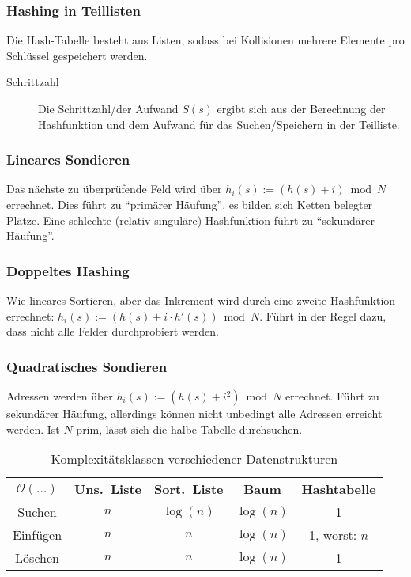 \subsubsection{Hashing in Teillisten}
Die Hash-Tabelle besteht aus Listen, sodass bei Kollisionen mehrere Elemente pro Schlüssel gespeichert werden.
\begin{description}
  \item[Schrittzahl] Die Schrittzahl/der Aufwand $S(s)$ ergibt sich aus der Berechnung der Hashfunktion und dem Aufwand für das Suchen/Speichern in der Teilliste.
\end{description}

\subsubsection{Lineares Sondieren}
Das nächste zu überprüfende Feld wird über $h_i(s) := (h(s) + i) \bmod N$ errechnet.
Dies führt zu \enquote{primärer Häufung}, es bilden sich Ketten belegter Plätze.
Eine schlechte (relativ singuläre) Hashfunktion führt zu \enquote{sekundärer Häufung}.

\subsubsection{Doppeltes Hashing}
Wie lineares Sortieren, aber das Inkrement wird durch eine zweite Hashfunktion errechnet: $h_i(s) := (h(s) + i \cdot h'(s)) \bmod N$.
Führt in der Regel dazu, dass nicht alle Felder durchprobiert werden.

\subsubsection{Quadratisches Sondieren}
Adressen werden über $h_i(s) := (h(s) + i^2) \bmod N$ errechnet.
Führt zu sekundärer Häufung, allerdings können nicht unbedingt alle Adressen erreicht werden.
Ist $N$ prim, lässt sich die halbe Tabelle durchsuchen.

\begin{table}[htb]
\centering
\begin{tabular}{ccccc}
\bfseries $\mathcal{O}(\ldots)$ & \bfseries Uns.~Liste & \bfseries Sort.~Liste & \bfseries Baum & \bfseries Hashtabelle \\
Suchen                & $n$               & $\log(n)$       & $\log(n)$ & 1 \\
Einfügen              & $n$               & $n$             & $\log(n)$ & 1, worst: $n$ \\
Löschen               & $n$               & $n$             & $\log(n)$ & 1
\end{tabular}

\caption{Komplexitätsklassen verschiedener Datenstrukturen}
\end{table}

